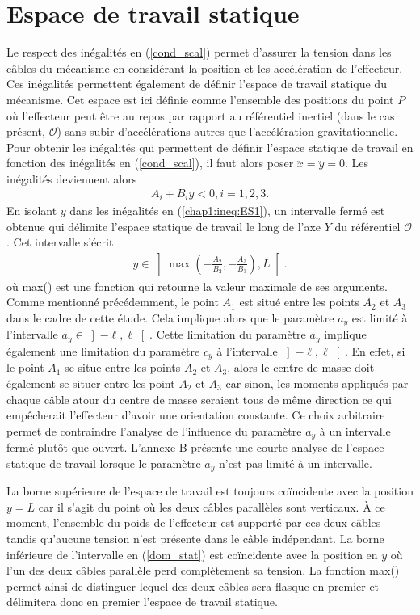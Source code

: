 \section{Espace de travail statique}
Le respect des inégalités en (\ref{cond_scal}) permet d'assurer la tension dans les câbles du mécanisme en considérant la position et les accélération de l'effecteur. Ces inégalités permettent également de définir l'espace de travail statique du mécanisme. Cet espace est ici définie comme l'ensemble des positions du point $P$ où l'effecteur peut être au repos par rapport au référentiel inertiel (dans le cas présent, $\mathcal{O}$) sans subir d'accélérations autres que l'accélération gravitationnelle. Pour obtenir les inégalités qui permettent de définir l'espace statique de travail en fonction des inégalités en (\ref{cond_scal}), il faut alors poser $\ddot{x}=\ddot{y}=0$. Les inégalités deviennent alors
\begin{align}
A_i+B_iy <0, i=1,2,3. \label{chap1:ineq:ES1}
\end{align}
En isolant $y$ dans les inégalités en (\ref{chap1:ineq:ES1}), un intervalle fermé est obtenue qui délimite l'espace statique de travail le long de l'axe $Y$ du référentiel $\mathcal{O}$. Cet intervalle s'écrit
\begin{align}
y \in \left]\max\left(-\frac{A_2}{B_2},-\frac{A_3}{B_3}\right),L\right[.\label{dom_stat}
\end{align}
où max() est une fonction qui retourne la valeur maximale de ses arguments. Comme mentionné précédemment, le point $A_1$ est situé entre les points $A_2$ et $A_3$ dans le cadre de cette étude. Cela implique alors que le paramètre $a_y$ est limité à l'intervalle $a_y \in \left]-\ell,\ell\right[$. Cette limitation du paramètre $a_y$ implique également une limitation du paramètre $c_y$ à l'intervalle $\left]-\ell,\ell\right[$. En effet, si le point $A_1$ se situe entre les points $A_2$ et $A_3$, alors le centre de masse doit également se situer entre les point $A_2$ et $A_3$ car sinon, les moments appliqués par chaque câble atour du centre de masse seraient tous de même direction ce qui empêcherait l'effecteur d'avoir une orientation constante. Ce choix arbitraire permet de contraindre l'analyse de l'influence du paramètre $a_y$ à un intervalle fermé plutôt que ouvert. L'annexe B présente une courte analyse de l'espace statique de travail lorsque le paramètre $a_y$ n'est pas limité à un intervalle. \par 
La borne supérieure de l'espace de travail est toujours coïncidente avec la position $y = L$ car il s'agit du point où les deux câbles parallèles sont verticaux. À ce moment, l'ensemble du poids de l'effecteur est supporté par ces deux câbles tandis qu'aucune tension n'est présente dans le câble indépendant. La borne inférieure de l'intervalle en (\ref{dom_stat}) est coïncidente avec la position en $y$ où l'un des deux câbles parallèle perd complètement sa tension. La fonction max() permet ainsi de distinguer lequel des deux câbles sera flasque en premier et délimitera donc en premier l'espace de travail statique.\par
